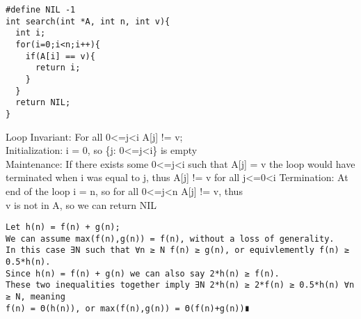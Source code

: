 \documentclass[11pt]{article}
\begin{document}
\begin{verbatim}
#define NIL -1
int search(int *A, int n, int v){
  int i;
  for(i=0;i<n;i++){
    if(A[i] == v){
      return i;
    }
  }
  return NIL;
}
\end{verbatim}
Loop Invariant: For all 0<=j<i A[j] != v;\\
Initialization: i = 0, so \{j: 0<=j<i\} is empty\\
Maintenance: If there exists some 0<=j<i such that A[j] = v the loop
would have terminated when i was equal to j, thus A[j] != v for all j<=0<i
Termination: At end of the loop i = n, so for all 0<=j<n A[j] != v, thus\\
v is not in A, so we can return NIL

\begin{verbatim}
Let h(n) = f(n) + g(n);
We can assume max(f(n),g(n)) = f(n), without a loss of generality.
In this case ∃N such that ∀n ≥ N f(n) ≥ g(n), or equivlemently f(n) ≥ 0.5*h(n).
Since h(n) = f(n) + g(n) we can also say 2*h(n) ≥ f(n).
These two inequalities together imply ∃N 2*h(n) ≥ 2*f(n) ≥ 0.5*h(n) ∀n ≥ N, meaning
f(n) = Θ(h(n)), or max(f(n),g(n)) = Θ(f(n)+g(n))∎
\end{verbatim}
\end{document}
